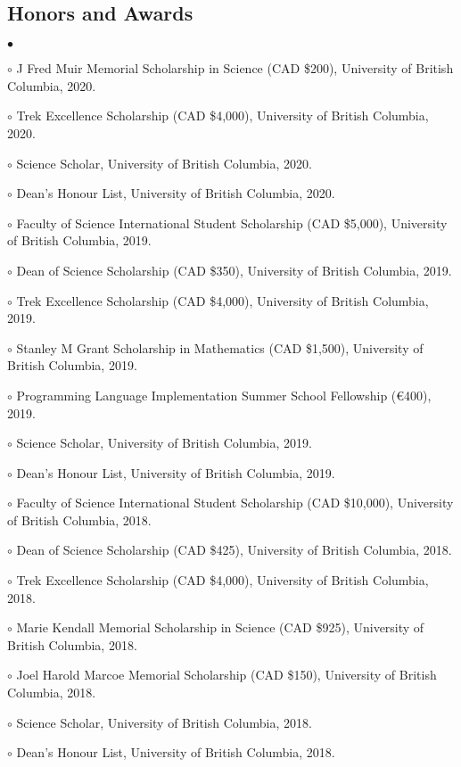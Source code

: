 \documentclass[margin,line]{res}
\newenvironment{list2}{
  \begin{list}{$\bullet$}{%
      \setlength{\itemsep}{0in}
      \setlength{\parsep}{0in} \setlength{\parskip}{0in}
      \setlength{\topsep}{0in} \setlength{\partopsep}{0in}
      \setlength{\leftmargin}{0.2in}}}{\end{list}}
\begin{document}
\begin{resume}
\section{\sc Honors and Awards}

\begin{list2}
\item[$\circ$] J Fred Muir Memorial Scholarship in Science (CAD \$200), University of British Columbia, 2020.
\item[$\circ$] Trek Excellence Scholarship (CAD \$4,000), University of British Columbia, 2020.
\item[$\circ$] Science Scholar, University of British Columbia, 2020.
\item[$\circ$] Dean's Honour List, University of British Columbia, 2020.
\item[$\circ$] Faculty of Science International Student Scholarship (CAD \$5,000), University of British Columbia, 2019.
\item[$\circ$] Dean of Science Scholarship (CAD \$350), University of British Columbia, 2019.
\item[$\circ$] Trek Excellence Scholarship (CAD \$4,000), University of British Columbia, 2019.
\item[$\circ$] Stanley M Grant Scholarship in Mathematics (CAD \$1,500), University of British Columbia, 2019.
\item[$\circ$] Programming Language Implementation Summer School Fellowship (€400), 2019.
\item[$\circ$] Science Scholar, University of British Columbia, 2019.
\item[$\circ$] Dean's Honour List, University of British Columbia, 2019.
\item[$\circ$] Faculty of Science International Student Scholarship (CAD \$10,000), University of British Columbia, 2018.
\item[$\circ$] Dean of Science Scholarship (CAD \$425), University of British Columbia, 2018.
\item[$\circ$] Trek Excellence Scholarship (CAD \$4,000), University of British Columbia, 2018.
\item[$\circ$] Marie Kendall Memorial Scholarship in Science (CAD \$925), University of British Columbia, 2018.
\item[$\circ$] Joel Harold Marcoe Memorial Scholarship (CAD \$150), University of British Columbia, 2018.
\item[$\circ$] Science Scholar, University of British Columbia, 2018.
\item[$\circ$] Dean's Honour List, University of British Columbia, 2018.

\end{list2}
\end{resume}
\end{document}
